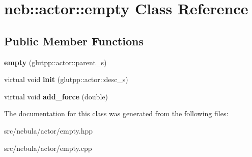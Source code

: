 \hypertarget{classneb_1_1actor_1_1empty}{
\section{neb::actor::empty Class Reference}
\label{classneb_1_1actor_1_1empty}
}
\subsection*{Public Member Functions}
\begin{DoxyCompactItemize}
\item 
\hypertarget{classneb_1_1actor_1_1empty_a986bad0e65988e8561985a8500cc2bdb}{
{\bfseries empty} (glutpp::actor::parent\_\-s)}
\label{classneb_1_1actor_1_1empty_a986bad0e65988e8561985a8500cc2bdb}

\item 
\hypertarget{classneb_1_1actor_1_1empty_af37fc36906e3f7af421bd444a0378b0f}{
virtual void {\bfseries init} (glutpp::actor::desc\_\-s)}
\label{classneb_1_1actor_1_1empty_af37fc36906e3f7af421bd444a0378b0f}

\item 
\hypertarget{classneb_1_1actor_1_1empty_a6eccecdc239e1dfb40701d274000160d}{
virtual void {\bfseries add\_\-force} (double)}
\label{classneb_1_1actor_1_1empty_a6eccecdc239e1dfb40701d274000160d}

\end{DoxyCompactItemize}


The documentation for this class was generated from the following files:\begin{DoxyCompactItemize}
\item 
src/nebula/actor/empty.hpp\item 
src/nebula/actor/empty.cpp\end{DoxyCompactItemize}
